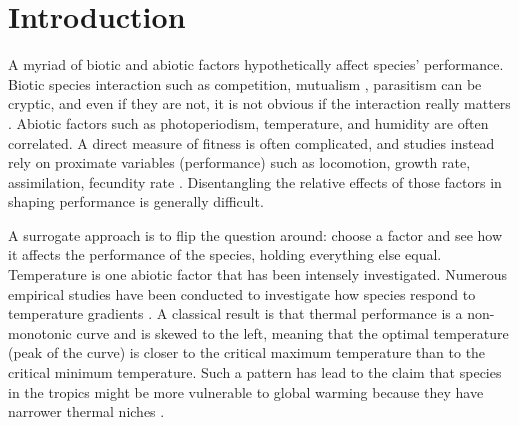 \section*{Introduction}
A myriad of biotic and abiotic factors  hypothetically affect species' performance.
Biotic species interaction such as competition, mutualism , parasitism can be cryptic, and even if they are not, it is not obvious if the interaction really matters \citep{Morales2015}. 
Abiotic factors such as photoperiodism, temperature, and humidity are often correlated. 
A direct measure of fitness is often complicated, and studies instead rely on proximate variables (performance) such as locomotion, growth rate, assimilation, fecundity rate \citep[][and references therein]{Angilletta2009}.
Disentangling the relative effects of those factors in shaping performance is generally difficult.
 
A surrogate approach is to flip the question around: choose a factor and see how it affects the performance of the species, holding everything else equal.
Temperature is one abiotic factor that has been intensely investigated.
Numerous empirical studies have been conducted to investigate how species respond to temperature gradients \citep[e.g.,][]{Angilletta2009}.
A classical result is that thermal performance is a non-monotonic curve and is skewed to the left, meaning that the optimal temperature (peak of the curve) is closer to the critical maximum temperature than to the critical minimum temperature. 
Such a pattern has lead to the claim that species in the tropics might be more vulnerable to global warming because they have narrower thermal niches \citep{Deutsch2008}. %

